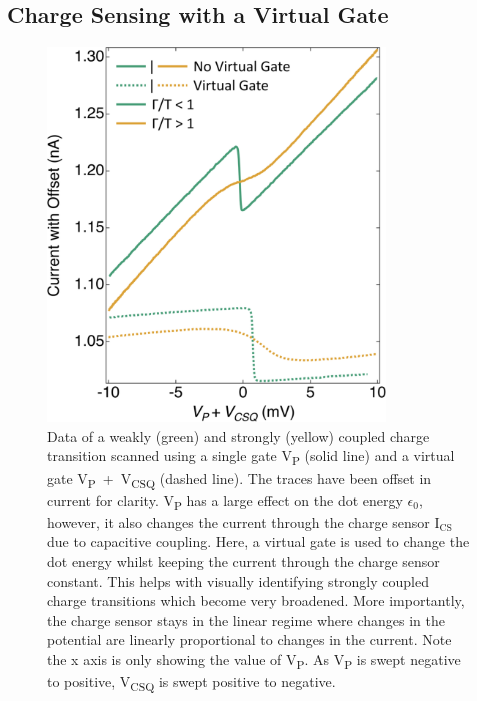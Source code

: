 \subsection{Charge Sensing with a Virtual Gate}

\begin{figure}[!htb]
  \begin{center}
    \includegraphics[width=0.8\textwidth]{figures/ch1/crop_FiguresMaster.012.png}
    \caption[Measuring charge transitions with and without a virtual gate]{\label{fig:ch1/virtual_gate_example} 
    Data of a weakly (green) and strongly (yellow) coupled charge transition scanned using a single gate V\textsubscript{P} (solid line) and a virtual gate  V\textsubscript{P}~+~V\textsubscript{CSQ} (dashed line). The traces have been offset in current for clarity. V\textsubscript{P} has a large effect on the dot energy $\epsilon_0$, however, it also changes the current through the charge sensor $\mathrm{I_{CS}}$ due to capacitive coupling. Here, a virtual gate is used to change the dot energy whilst keeping the current through the charge sensor constant. This helps with visually identifying strongly coupled charge transitions which become very broadened. More importantly, the charge sensor stays in the linear regime where changes in the potential are linearly proportional to changes in the current. Note the x axis is only showing the value of V\textsubscript{P}. As V\textsubscript{P} is swept negative to positive, V\textsubscript{CSQ} is swept positive to negative.}
  \end{center}
\end{figure}


